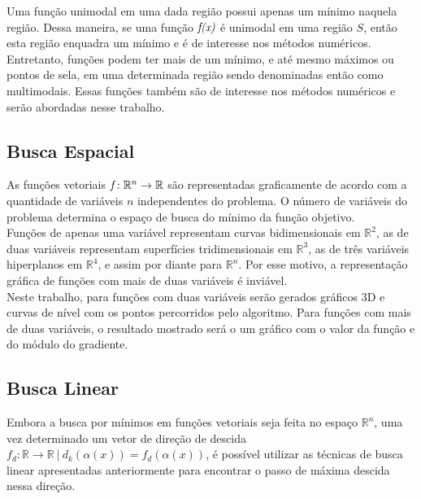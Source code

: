 \documentclass[a4paper,12pt,utf8x,notitlepage]{article}
\begin{document}
Uma função unimodal em uma dada região possui apenas um mínimo naquela região. Dessa maneira, se uma função $\emph{f(x)}$ é unimodal em uma região $S$, então esta região enquadra um mínimo e é de interesse nos métodos numéricos.\\

Entretanto, funções podem ter mais de um mínimo, e até mesmo máximos ou pontos de sela, em uma determinada região sendo denominadas então como multimodais. Essas funções também são de interesse nos métodos numéricos e serão abordadas nesse trabalho.\\

\subsection{Busca Espacial}

\vspace{0.5cm}

As funções vetoriais $\emph{f}:  \mathbb{R}^n \rightarrow  \mathbb{R}$ são representadas graficamente de acordo com a quantidade de variáveis $n$ independentes do problema. O número de variáveis do problema determina o espaço de busca do mínimo da função objetivo.\\

Funções de apenas uma variável representam curvas bidimensionais em $\mathbb{R}^2$, as de duas variáveis representam superfícies tridimensionais em $\mathbb{R}^3$, as de três variáveis hiperplanos em $\mathbb{R}^4$, e assim por diante para $\mathbb{R}^n$. Por esse motivo, a representação gráfica de funções com mais de duas variáveis é inviável.\\

Neste trabalho, para funções com duas variáveis serão gerados gráficos 3D e curvas de nível com os pontos percorridos pelo algoritmo. Para funções com mais de duas variáveis, o resultado mostrado será o um gráfico com o valor da função e do módulo do gradiente. 

\subsection{Busca Linear}

Embora a busca por mínimos em funções vetoriais seja feita no espaço $\mathbb{R}^n$, uma vez determinado um vetor de direção de descida  $f_d : \mathbb{R} \rightarrow  \mathbb{R}\ |\ d_k(\alpha(x))=f_d(\alpha(x))$, é possível utilizar as técnicas de busca linear apresentadas anteriormente para encontrar o passo de máxima descida nessa direção.\\
\end{document}

